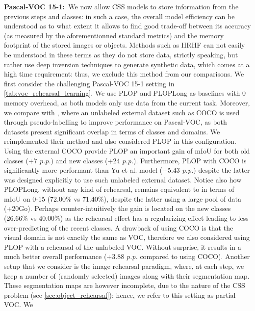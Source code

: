 \noindent\textbf{Pascal-VOC 15-1:\,} We now allow CSS models to store information from the previous
steps and classes: in such a case, the overall model efficiency can be understood as to what extent
it allows to find good trade-off between its accuracy (as measured by the aforementionned standard
metrics) and the memory footprint of the stored images or objects. Methods such as HRHF
\citep{huang2021halfrealhalffake} can not easily be understood in these terms as they do not store
data, strictly speaking, but rather use deep inversion \citep{yin20deepinversion} techniques to
generate synthetic data, which comes at a high time requirement: thus, we exclude this method from
our comparisons. We first consider the challenging Pascal-VOC 15-1 setting in
\autoref{tab:voc_rehearsal_learning}. We use PLOP and PLOPLong as baselines with 0 memory overhead,
as both models only use data from the current task. Moreover, we compare with
\citep{yu2020continualsegmentationselftraining}, where an unlabeled external dataset such as COCO
\citep{lin2014mscocodataset} is used through pseudo-labelling to improve performance on Pascal-VOC,
as both datasets present significant overlap in terms of classes and domains. We reimplemented their
method and also considered PLOP in this configuration. Using the external COCO provide PLOP an
important gain of mIoU for both old classes (+7 \textit{p.p.}) and new classes (+24 \textit{p.p.}).
Furthermore, PLOP with COCO is significantly more performant than Yu et al. model (+5.43
\textit{p.p.}) despite the latter was designed explicitly to use such unlabeled external dataset.
Notice also how PLOPLong, without any kind of rehearsal, remains equivalent to
\citep{yu2020continualsegmentationselftraining} in terms of mIoU on 0-15 (72.00\% vs 71.40\%),
despite the latter using a large pool of data (+20Go). Perhaps counter-intuitively the gain is
located on the new classes (26.66\% vs 40.00\%) as the rehearsal effect has a regularizing effect
leading to less over-predicting of the recent classes. A drawback of using COCO is that the visual
domain is not exactly the same as VOC, therefore we also considered using PLOP with a rehearsal of
the unlabeled VOC. Without surprise, it results in a much better overall performance (+3.88
\textit{p.p.} compared to using COCO). Another setup that we consider is the image rehearsal
paradigm, where, at each step, we keep a number of (randomly selected) images along with their
segmentation map. These segmentation maps are however incomplete, due to the nature of the CSS
problem (see \autoref{sec:object_rehearsal}): hence, we refer to this setting as partial VOC. We
